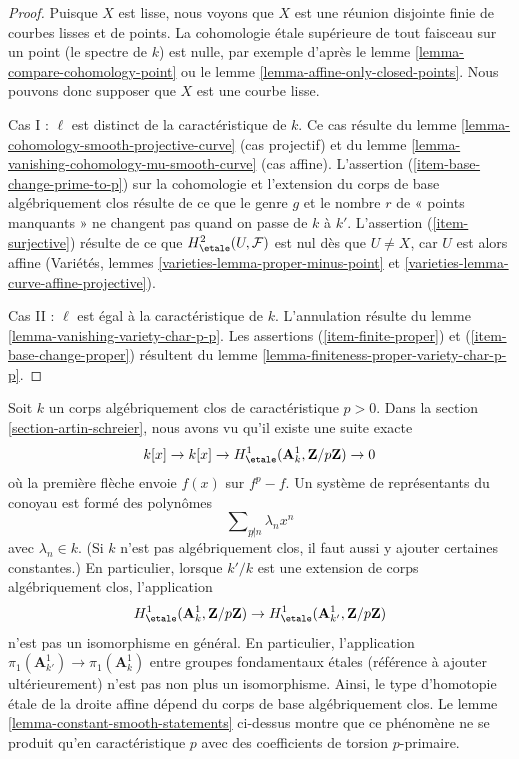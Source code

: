 \begin{proof}
Puisque $X$ est lisse, nous voyons que $X$ est une réunion disjointe finie de
courbes lisses et de points. La cohomologie étale supérieure de tout faisceau
sur un point (le spectre de $k$) est nulle, par exemple d'après le
lemme \ref{lemma-compare-cohomology-point}
ou le lemme \ref{lemma-affine-only-closed-points}.
Nous pouvons donc supposer que $X$ est une courbe lisse.

\medskip\noindent
Cas I : $\ell$ est distinct de la caractéristique de $k$.
Ce cas résulte du
lemme \ref{lemma-cohomology-smooth-projective-curve}
(cas projectif) et du
lemme \ref{lemma-vanishing-cohomology-mu-smooth-curve}
(cas affine). L'assertion (\ref{item-base-change-prime-to-p})
sur la cohomologie et l'extension du corps de base algébriquement clos
résulte de ce que le genre $g$ et le nombre $r$
de « points manquants » ne changent pas quand on passe de $k$ à $k'$.
L'assertion (\ref{item-surjective}) résulte de ce que $H^2_\etale(U, \mathcal{F})$
est nul dès que $U \not = X$, car $U$ est alors affine
(Variétés, lemmes \ref{varieties-lemma-proper-minus-point} et
\ref{varieties-lemma-curve-affine-projective}).

\medskip\noindent
Cas II : $\ell$ est égal à la caractéristique de $k$.
L'annulation résulte du lemme \ref{lemma-vanishing-variety-char-p-p}.
Les assertions (\ref{item-finite-proper}) et (\ref{item-base-change-proper})
résultent du
lemme \ref{lemma-finiteness-proper-variety-char-p-p}.
\end{proof}

\begin{remark}
\label{remark-invariance}
Soit $k$ un corps algébriquement clos de caractéristique $p > 0$.
Dans la section \ref{section-artin-schreier}, nous avons vu qu'il existe
une suite exacte
$$
k[x] \to k[x] \to
H^1_\etale(\mathbf{A}^1_k, \mathbf{Z}/p\mathbf{Z}) \to 0
$$
où la première flèche envoie $f(x)$ sur $f^p - f$. Un système de représentants
du conoyau est formé des polynômes
$$
\sum\nolimits_{p \not | n} \lambda_n x^n
$$
avec $\lambda_n \in k$. (Si $k$ n'est pas algébriquement clos,
il faut aussi y ajouter certaines constantes.) En particulier,
lorsque $k'/k$ est une extension de corps algébriquement clos,
l'application
$$
H^1_\etale(\mathbf{A}^1_k, \mathbf{Z}/p\mathbf{Z})
\to
H^1_\etale(\mathbf{A}^1_{k'}, \mathbf{Z}/p\mathbf{Z})
$$
n'est pas un isomorphisme en général. En particulier, l'application
$\pi_1(\mathbf{A}^1_{k'}) \to \pi_1(\mathbf{A}^1_k)$
entre groupes fondamentaux étales (référence à ajouter ultérieurement)
n'est pas non plus un isomorphisme. Ainsi, le type d'homotopie étale
de la droite affine dépend du corps de base algébriquement clos.
Le lemme \ref{lemma-constant-smooth-statements} ci-dessus montre
que ce phénomène ne se produit qu'en caractéristique $p$
avec des coefficients de torsion $p$-primaire.
\end{remark}

